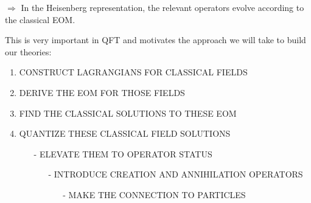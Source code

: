 \documentclass{article}
\begin{document}
\noindent $\Longrightarrow$ \quad In the Heisenberg representation, the relevant operators evolve according to the classical EOM.

\noindent This is very important in QFT and motivates the approach we will take to build our theories:
\begin{enumerate}
    \item CONSTRUCT LAGRANGIANS FOR CLASSICAL FIELDS
    \item DERIVE THE EOM FOR THOSE FIELDS
    \item FIND THE CLASSICAL SOLUTIONS TO THESE EOM
    \item QUANTIZE THESE CLASSICAL FIELD SOLUTIONS
    \begin{itemize}
        \item[-] ELEVATE THEM TO OPERATOR STATUS
        \begin{itemize}
            \item[-] INTRODUCE CREATION AND ANNIHILATION OPERATORS
            \begin{itemize}
                \item[-] MAKE THE CONNECTION TO PARTICLES
            \end{itemize}
        \end{itemize}
    \end{itemize}
\end{enumerate}
\end{document}
